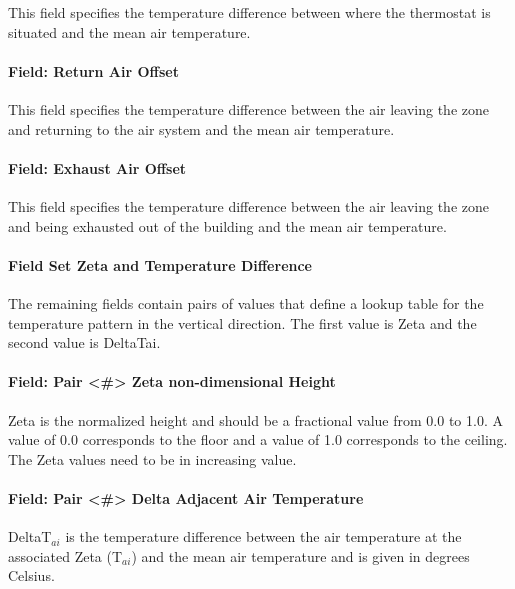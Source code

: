 This field specifies the temperature difference between where the thermostat is situated and the mean air temperature.

\paragraph{Field: Return Air Offset}\label{field-return-air-offset-1}

This field specifies the temperature difference between the air leaving the zone and returning to the air system and the mean air temperature.

\paragraph{Field: Exhaust Air Offset}\label{field-exhaust-air-offset-1}

This field specifies the temperature difference between the air leaving the zone and being exhausted out of the building and the mean air temperature.

\paragraph{Field Set Zeta and Temperature Difference}\label{field-set-zeta-and-temperature-difference}

The remaining fields contain pairs of values that define a lookup table for the temperature pattern in the vertical direction. The first value is Zeta and the second value is DeltaTai.

\paragraph{Field: Pair \textless{}\#\textgreater{} Zeta non-dimensional Height}\label{field-pair-zeta-non-dimensional-height}

Zeta is the normalized height and should be a fractional value from 0.0 to 1.0. A value of 0.0 corresponds to the floor and a value of 1.0 corresponds to the ceiling. The Zeta values need to be in increasing value.

\paragraph{Field: Pair \textless{}\#\textgreater{} Delta Adjacent Air Temperature}\label{field-pair-delta-adjacent-air-temperature}

DeltaT\(_{ai}\) is the temperature difference between the air temperature at the associated Zeta (T\(_{ai}\)) and the mean air temperature and is given in degrees Celsius.

